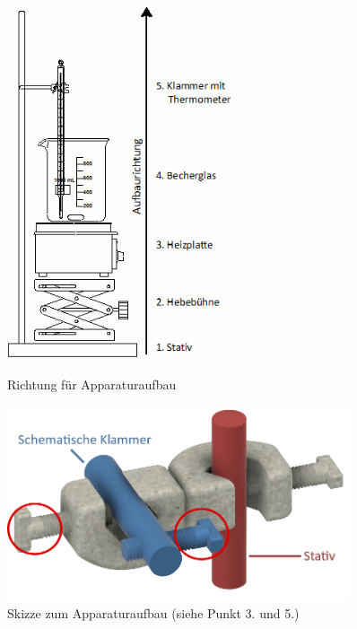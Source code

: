 \begin{figure}[h!]
	\begin{minipage}[b]{.45\textwidth} %
		\centering
		\includegraphics[width=0.6\textwidth]{img/Grundaufbau_Apparatur.png}
		\caption{Richtung für Apparaturaufbau}
	\end{minipage}
	\hspace{.1\linewidth}%
	\begin{minipage}[b]{.45\textwidth} %
		\centering
		\includegraphics[width=0.9\textwidth]{img/muffe_anmerkung2.png}
		\caption{Skizze zum Apparaturaufbau (siehe Punkt 3. und 5.)}
	\end{minipage}
\end{figure}
\FloatBarrier





